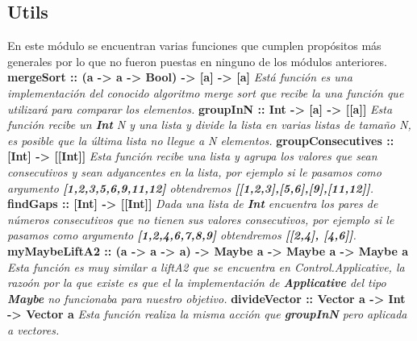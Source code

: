 \documentclass[12pt]{article}
\begin{document}
\subsection{Utils}
En este m\'odulo se encuentran varias funciones que cumplen prop\'ositos m\'as generales por lo que no fueron puestas en ninguno de los m\'odulos anteriores.
\newline \newline
{\bf mergeSort :: (a -> a -> Bool) -> [a] -> [a]}\newline
{\it Est\'a funci\'on es una implementaci\'on del conocido algoritmo merge sort que recibe la una funci\'on que utilizar\'a para comparar los elementos.}
\newline \newline
{\bf groupInN :: Int -> [a] -> [[a]]}\newline
{\it Esta funci\'on recibe un {\bf Int} N y una lista y divide la lista en varias listas de tama\~no N, es posible que la \'ultima lista no llegue a N elementos.}
\newline \newline
{\bf groupConsecutives :: [Int] -> [[Int]]}\newline
{\it Esta funci\'on recibe una lista y agrupa los valores que sean consecutivos y sean adyancentes en la lista, por ejemplo si le pasamos como argumento {\bf [1,2,3,5,6,9,11,12]} obtendremos {\bf [[1,2,3],[5,6],[9],[11,12]]}.}
\newline \newline
{\bf findGaps :: [Int] -> [[Int]]}\newline
{\it Dada una lista de {\bf Int} encuentra los pares de n\'umeros consecutivos que no tienen sus valores consecutivos, por ejemplo si le pasamos como argumento {\bf [1,2,4,6,7,8,9]} obtendremos {\bf [[2,4], [4,6]]}.}
\newline \newline
{\bf myMaybeLiftA2 :: (a -> a -> a) -> Maybe a -> Maybe a -> Maybe a}\newline
{\it Esta funci\'on es muy similar a liftA2 que se encuentra en Control.Applicative, la razo\'on por la que existe es que el la implementaci\'on de {\bf Applicative} del tipo {\bf Maybe} no funcionaba para nuestro objetivo.}
\newline \newline
{\bf divideVector :: Vector a -> Int -> Vector a}\newline
{\it Esta funci\'on realiza la misma acci\'on que {\bf groupInN} pero aplicada a vectores.}
\end{document}

